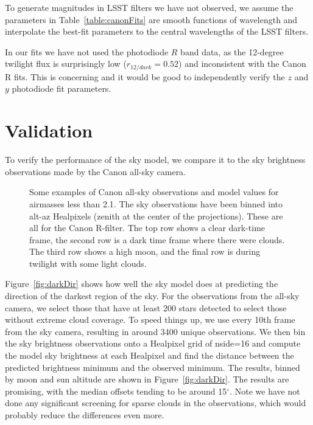 \documentclass[]{spie}
\newcommand\degree{{^\circ}}
\begin{document}
To generate magnitudes in LSST filters we have not observed, we assume the parameters in Table~\ref{table:canonFits} are smooth functions of wavelength and interpolate the best-fit parameters to the central wavelengths of the LSST filters.

In our fits we have not used the photodiode $R$ band data, as the 12-degree twilight flux is surprisingly low ($r_{12/dark}=0.52$) and inconsistent with the Canon R fits.  This is concerning and it would be good to independently verify the $z$ and $y$ photodiode fit parameters.


\section{Validation}\label{sec:validate}

To verify the performance of the sky model, we compare it to the sky brightness observations made by the Canon all-sky camera.

\begin{figure*}
  \caption{Some examples of Canon all-sky observations and model values for airmasses less than 2.1. The sky observations have been binned into alt-az Healpixels (zenith at the center of the projections). These are all for the Canon R-filter. The top row shows a clear dark-time frame, the second row is a dark time frame where there were clouds. The third row shows a high moon, and the final row is during twilight with some light clouds. \label{fig:skyExamples}}
\end{figure*}



Figure~\ref{fig:darkDir} shows how well the sky model does at predicting the direction of the darkest region of the sky.  For the observations from the all-sky camera, we select those that have at least 200 stars detected to select those without extreme cloud coverage. To speed things up, we use every 10th frame from the sky camera, resulting in around 3400 unique observations.  We then bin the sky brightness observations onto a Healpixel grid of nside=16 and compute the model sky brightness at each Healpixel and find the distance between the predicted brightness minimum and the observed minimum.  The results, binned by moon and sun altitude are shown in Figure~\ref{fig:darkDir}.  The results are promising, with the median offsets tending to be around 15$\degree$.  Note we have not done any significant screening for sparse clouds in the observations, which would probably reduce the differences even more. 
\end{document}
